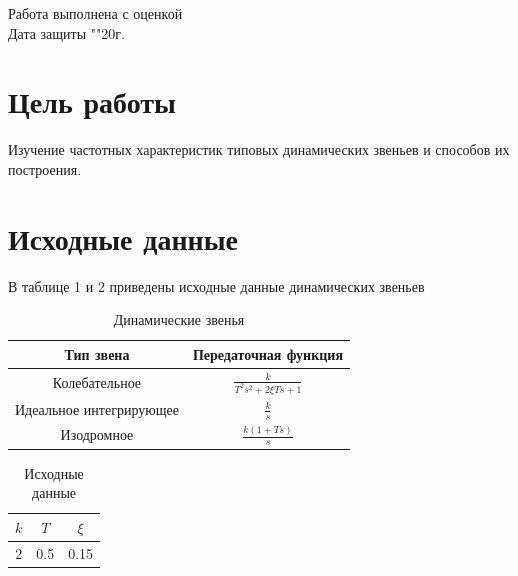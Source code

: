 \documentclass[a4paper, 12pt]{article}
\begin{document}
\begin{titlepage}
		Работа выполнена с оценкой \hspace{0.5cm} \underline{\hspace{10cm}} \\ 
		\vspace{1cm}
		Дата защиты "\underline{\hspace{0.4cm}}"\hspace{0.1cm}\underline{\hspace{1.5cm}}\hspace{0.1cm}20\underline{\hspace{0.4cm}}г.
		
	\end{titlepage}

\section*{Цель работы}
Изучение частотных характеристик типовых динамических звеньев и способов их построения.

\section*{Исходные данные}
В таблице 1 и 2 приведены исходные данные динамических звеньев 

\begin{table}[h!]
	\centering
	\begin{threeparttable}
	\caption{Динамические звенья}
	\label{data1}
	\begin{tabular}{|c|c|}
		\hline
		Тип звена & Передаточная функция\\
		\hline
		Колебательное & $\frac{k}{T^2s^2 + 2\xi Ts + 1}$\\
		\hline
		Идеальное интегрирующее & $\frac{k}{s}$\\
		\hline
		Изодромное & $\frac{k(1+Ts)}{s}$\\
		\hline
	\end{tabular}

\end{threeparttable}
\end{table}

\begin{table}[h!]
	\centering
	\begin{threeparttable}	
	\label{data2}
	\caption{Исходные данные}
	\begin{tabular}{|c|c|c|}
		\hline
		$k$ & $T$ & $\xi$ \\
		\hline
		2 & 0.5 & 0.15\\
		\hline
	\end{tabular}
	\end{threeparttable}
\end{table}
		
\end{document}

